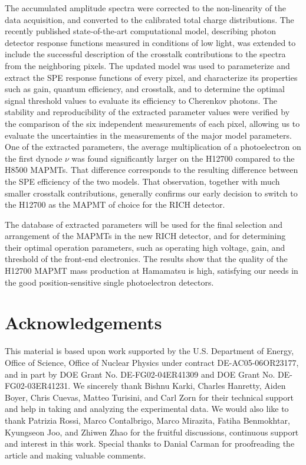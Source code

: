 The accumulated amplitude spectra were corrected to the non-linearity of the data acquisition, and converted to the calibrated total charge distributions. The recently published state-of-the-art computational model, describing photon detector response functions measured in conditions of low light, was extended to include the successful description of the crosstalk contributions to the spectra from the neighboring pixels. The updated model was used to parameterize and extract the SPE response functions of every pixel, and characterize its properties such as gain, quantum efficiency, and crosstalk, and to determine the optimal signal threshold values to evaluate its efficiency to Cherenkov photons. The stability and reproducibility of the extracted parameter values were verified by the comparison of the six independent measurements of each pixel, allowing us to evaluate the uncertainties in the measurements of the major model parameters. One of the extracted parameters, the average multiplication of a photoelectron on the first dynode $\nu$ was found significantly larger on the H12700 compared to the H8500 MAPMTs. That difference corresponds to the resulting difference between the SPE efficiency of the two models.  That observation, together with much smaller crosstalk contributions, generally confirms our early decision to switch to the H12700 as the MAPMT of choice for the RICH detector.

The database of extracted parameters will be used for the final selection and arrangement of the MAPMTs in the new RICH detector, and for determining their optimal operation parameters, such as operating high voltage, gain, and threshold of the front-end electronics. The results show that the quality of the H12700 MAPMT mass production at Hamamatsu is high, satisfying our needs in the good position-sensitive single photoelectron detectors.



\section{Acknowledgements}
This material is based upon work supported by the U.S. Department of Energy, Office of Science, Office of Nuclear Physics under contract DE-AC05-06OR23177, and in part by DOE Grant No. DE-FG02-04ER41309 and DOE Grant No. DE-FG02-03ER41231. 
We sincerely thank 
Bishnu Karki,
Charles Hanretty,
Aiden Boyer,
Chris  Cuevas,
Matteo Turisini, and
Carl Zorn
for their technical support and help in taking and analyzing the experimental data. We would
also like to thank 
Patrizia Rossi, 
Marco Contalbrigo, 
Marco Mirazita,
Fatiha Benmokhtar,
Kyungseon Joo,
and Zhiwen Zhao
for the fruitful discussions, continuous support and interest in this work. Special thanks to Danial Carman for proofreading the article and making valuable comments.